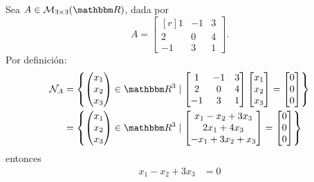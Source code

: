 \begin{example}
    Sea $A \in \mathcal{M}_{3 \times 3}(\RR)$, dada por
    $$A = \begin{bmatrix*}[r]
        1 & -1 & 3 \\
        2 & 0 & 4 \\
        -1 & 3 & 1
    \end{bmatrix*}.$$
    Por definición:
    \begin{align*}
        \mathcal{N}_A & = \left\{ \begin{pmatrix}
            x_1 \\
            x_2 \\
            x_3 
        \end{pmatrix} \in \RR[3] \mid \begin{bmatrix*}
            1 & -1 & 3 \\
            2 & 0 & 4 \\
            -1 & 3 & 1
        \end{bmatrix*} \begin{bmatrix}
            x_1 \\
            x_2 \\
            x_3
        \end{bmatrix} = \begin{bmatrix}
            0 \\
            0 \\
            0
        \end{bmatrix} \right\} \\
        & = \left\{ \begin{pmatrix}
            x_1 \\
            x_2 \\
            x_3 \\
        \end{pmatrix} \in \RR[3] \mid \begin{bmatrix}
            x_1 - x_2 + 3x_3 \\
            2x_1 + 4x_3 \\
            -x_1 + 3x_2 + x_3
        \end{bmatrix} = \begin{bmatrix}
            0 \\
            0 \\
            0
        \end{bmatrix} \right\}
    \end{align*}
    entonces
    \begin{align}
        x_1 - x_2 + 3x_3 & = 0 \label{JDHFJDJKDHJVHFHGHKH} \\

\end{align}
\end{example}
